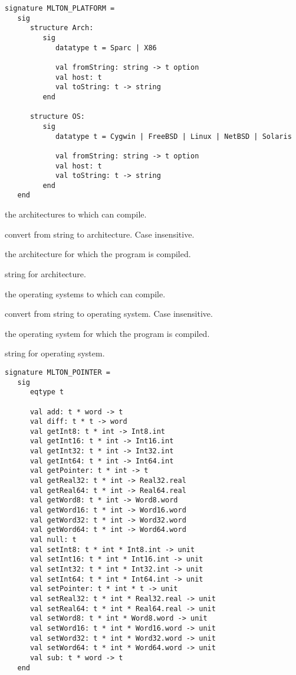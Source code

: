 \begin{verbatim}
signature MLTON_PLATFORM =
   sig
      structure Arch:
         sig
            datatype t = Sparc | X86

            val fromString: string -> t option
            val host: t
            val toString: t -> string
         end
         
      structure OS:
         sig
            datatype t = Cygwin | FreeBSD | Linux | NetBSD | Solaris

            val fromString: string -> t option
            val host: t
            val toString: t -> string
         end
   end
\end{verbatim}

\begin{description}

the architectures to which {\mlton} can compile.

convert from string to architecture.  Case insensitive.

the architecture for which the program is compiled.

string for architecture.

the operating systems to which {\mlton} can compile.

convert from string to operating system.  Case insensitive.

the operating system for which the program is compiled.

string for operating system.

\end{description}
%

\begin{verbatim}
signature MLTON_POINTER =
   sig
      eqtype t

      val add: t * word -> t
      val diff: t * t -> word
      val getInt8: t * int -> Int8.int
      val getInt16: t * int -> Int16.int
      val getInt32: t * int -> Int32.int
      val getInt64: t * int -> Int64.int
      val getPointer: t * int -> t
      val getReal32: t * int -> Real32.real
      val getReal64: t * int -> Real64.real
      val getWord8: t * int -> Word8.word
      val getWord16: t * int -> Word16.word
      val getWord32: t * int -> Word32.word
      val getWord64: t * int -> Word64.word
      val null: t
      val setInt8: t * int * Int8.int -> unit
      val setInt16: t * int * Int16.int -> unit
      val setInt32: t * int * Int32.int -> unit
      val setInt64: t * int * Int64.int -> unit
      val setPointer: t * int * t -> unit
      val setReal32: t * int * Real32.real -> unit
      val setReal64: t * int * Real64.real -> unit
      val setWord8: t * int * Word8.word -> unit
      val setWord16: t * int * Word16.word -> unit
      val setWord32: t * int * Word32.word -> unit
      val setWord64: t * int * Word64.word -> unit
      val sub: t * word -> t
   end
\end{verbatim}

